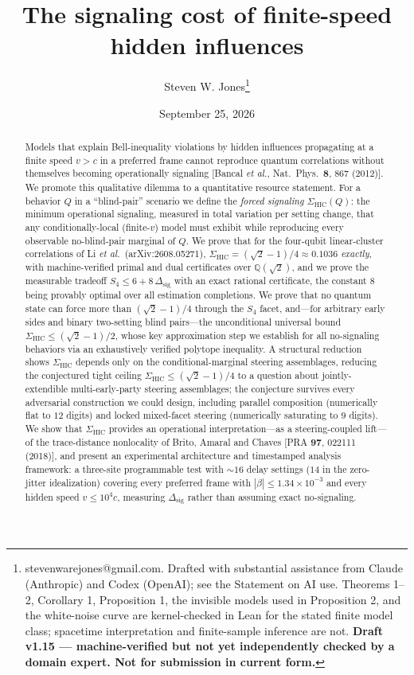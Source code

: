 \documentclass[10pt,twocolumn]{article}
\title{\textbf{The signaling cost of finite-speed hidden influences}}
\author{Steven W. Jones\thanks{stevenwarejones@gmail.com. Drafted with substantial assistance from Claude (Anthropic) and Codex (OpenAI); see the Statement on AI use. Theorems 1--2, Corollary 1, Proposition 1,
the invisible models used in Proposition 2, and the white-noise curve are
kernel-checked in Lean for the stated finite model class; spacetime
interpretation and finite-sample inference are not. \textbf{Draft v1.15 --- machine-verified but not yet independently checked by a domain expert. Not for submission in current form.}}}
\date{September 25, 2026}
\newcommand{\Sig}{\Sigma_{\mathrm{HIC}}}
\newcommand{\Dsig}{\Delta_{\mathrm{sig}}}
\begin{document}
\maketitle

\begin{abstract}
\noindent Models that explain Bell-inequality violations by hidden influences propagating at a finite speed $v>c$ in a preferred frame cannot reproduce quantum correlations without themselves becoming operationally signaling [Bancal \emph{et al.}, Nat.\ Phys.\ \textbf{8}, 867 (2012)]. We promote this qualitative dilemma to a quantitative resource statement. For a behavior $Q$ in a ``blind-pair'' scenario we define the \emph{forced signaling} $\Sig(Q)$: the minimum operational signaling, measured in total variation per setting change, that any conditionally-local (finite-$v$) model must exhibit while reproducing every observable no-blind-pair marginal of $Q$. We prove that for the four-qubit linear-cluster correlations of Li \emph{et al.}\ (arXiv:2608.05271), $\Sig = (\sqrt2-1)/4 \approx 0.1036$ \emph{exactly}, with machine-verified primal and dual certificates over $\mathbb{Q}(\sqrt2)$, and we prove the measurable tradeoff $S_4 \le 6 + 8\,\Dsig$ with an exact rational certificate, the constant $8$ being provably optimal over all estimation completions. We prove that no quantum state can force more than $(\sqrt2-1)/4$ through the $S_4$ facet, and---for arbitrary early sides and binary two-setting blind pairs---the unconditional universal bound $\Sig \le (\sqrt2-1)/2$, whose key approximation step we establish for all no-signaling behaviors via an exhaustively verified polytope inequality. A structural reduction shows $\Sig$ depends only on the conditional-marginal steering assemblages, reducing the conjectured tight ceiling $\Sig \le (\sqrt2-1)/4$ to a question about jointly-extendible multi-early-party steering assemblages; the conjecture survives every adversarial construction we could design, including parallel composition (numerically flat to $12$ digits) and locked mixed-facet steering (numerically saturating to $9$ digits). We show that $\Sig$ provides an operational interpretation---as a steering-coupled lift---of the trace-distance nonlocality of Brito, Amaral and Chaves [PRA \textbf{97}, 022111 (2018)], and present an experimental architecture and timestamped analysis framework: a three-site programmable test with ${\sim}16$ delay settings ($14$ in the zero-jitter idealization) covering every preferred frame with $|\beta|\le1.34\times10^{-3}$ and every hidden speed $v\le10^4c$, measuring $\Dsig$ rather than assuming exact no-signaling.
\end{abstract}
\end{document}
